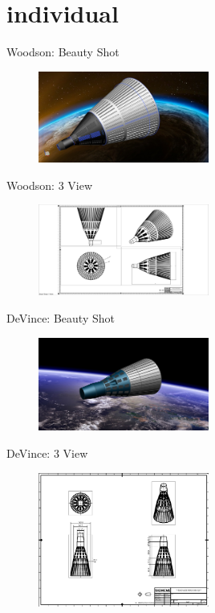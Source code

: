 \documentclass[10pt]{beamer}
\begin{document}
\section{individual}


	\begin{frame}{Woodson: Beauty Shot}
\begin{figure}
	\centering
	\includegraphics[width=0.5\textwidth]{Woodson_Beauty.png}
\end{figure}
\end{frame}

	\begin{frame}{Woodson: 3 View}
\begin{figure}
	\centering
	\includegraphics[width=0.5\textwidth]{Woodson_3_View.png}
\end{figure}
\end{frame}

	\begin{frame}{DeVince: Beauty Shot}
\begin{figure}
	\centering
	\includegraphics[width=0.5\textwidth]{DeVince_Beauty.png}
\end{figure}
\end{frame}

\begin{frame}{DeVince: 3 View}
\begin{figure}
\centering
\includegraphics[width=0.5\textwidth]{DeVince_3_View.png}
\end{figure}
\end{frame}
\end{document}

